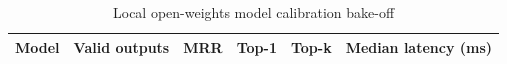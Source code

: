 
\begin{table}[htbp]
\centering
\caption{Local open-weights model calibration bake-off}
\label{tab:local-model-calibration-bakeoff}
\begin{tabular}{lrrrrr}
\hline
Model & Valid outputs & MRR & Top-1 & Top-k & Median latency (ms) \\
\hline
\hline
\end{tabular}
\end{table}
